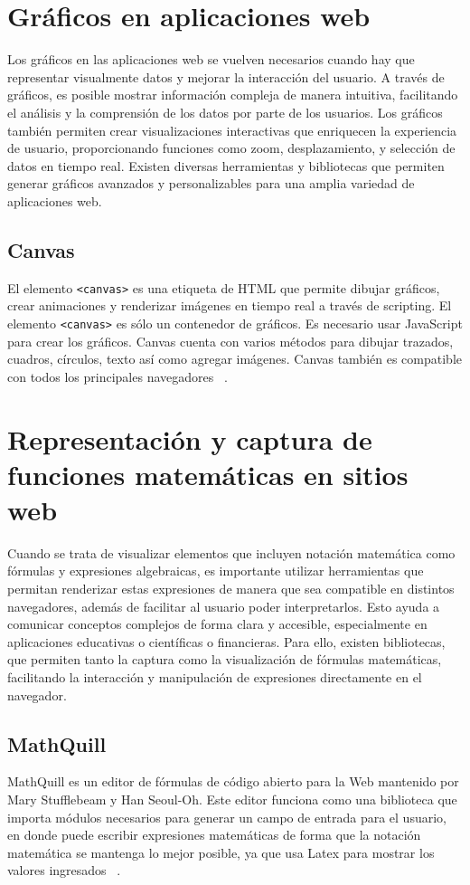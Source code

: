 \section{Gráficos en aplicaciones web}
Los gráficos en las aplicaciones web se vuelven necesarios cuando hay que representar visualmente datos y mejorar la interacción del usuario. A través de gráficos, es posible mostrar información compleja de manera intuitiva, facilitando el análisis y la comprensión de los datos por parte de los usuarios. Los gráficos también permiten crear visualizaciones interactivas que enriquecen la experiencia de usuario, proporcionando funciones como zoom, desplazamiento, y selección de datos en tiempo real. Existen diversas herramientas y bibliotecas que permiten generar gráficos avanzados y personalizables para una amplia variedad de aplicaciones web.

\subsection{Canvas}
El elemento \texttt{<canvas>} es una etiqueta de HTML que permite dibujar gráficos, crear animaciones y renderizar imágenes en tiempo real a través de scripting. El elemento \texttt{<canvas>} es sólo un contenedor de gráficos. Es necesario usar JavaScript para crear los gráficos. Canvas cuenta con varios métodos para dibujar trazados, cuadros, círculos, texto así como agregar imágenes. Canvas también es compatible con todos los principales navegadores ~\cite{CanvasHTMLW3S}.  

\section{Representación y captura de funciones matemáticas en sitios web}
Cuando se trata de visualizar elementos que incluyen notación matemática como fórmulas y expresiones algebraicas, es importante utilizar herramientas que permitan renderizar estas expresiones de manera que sea compatible en distintos navegadores, además de facilitar al usuario poder interpretarlos. Esto ayuda a comunicar conceptos complejos de forma clara y accesible, especialmente en aplicaciones educativas o científicas o financieras. Para ello, existen bibliotecas, que permiten tanto la captura como la visualización de fórmulas matemáticas, facilitando la interacción y manipulación de expresiones directamente en el navegador.

\subsection{MathQuill}
MathQuill es un editor de fórmulas de código abierto para la Web mantenido por Mary Stufflebeam y Han Seoul-Oh. Este editor funciona como una biblioteca que importa módulos necesarios para generar un campo de entrada para el usuario, en donde puede escribir expresiones matemáticas de forma que la notación matemática se mantenga lo mejor posible, ya que usa Latex para mostrar los valores ingresados ~\cite{mathquill}. 

